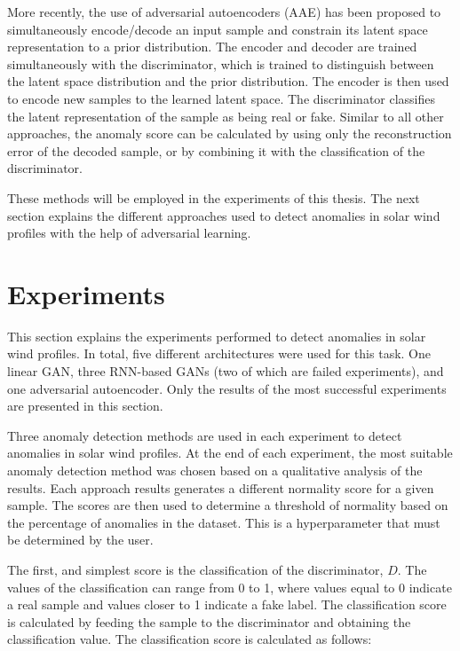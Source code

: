 More recently, the use of adversarial autoencoders (AAE) has been proposed \cite{zenati.etal_AdversariallyLearnedAnomaly_2018,wang.etal_AdVAESelfadversarialVariational_2020} to simultaneously encode/decode an input sample and constrain its latent space representation to a prior distribution. The encoder and decoder are trained simultaneously with the discriminator, which is trained to distinguish between the latent space distribution and the prior distribution. The encoder is then used to encode new samples to the learned latent space. The discriminator classifies the latent representation of the sample as being real or fake. Similar to all other approaches, the anomaly score can be calculated by using only the reconstruction error of the decoded sample, or by combining it with the classification of the discriminator.

These methods will be employed in the experiments of this thesis. The next section explains the different approaches used to detect anomalies in solar wind profiles with the help of adversarial learning.

\section{Experiments}\label{sec:gan_experiments}
This section explains the experiments performed to detect anomalies in solar wind profiles. In total, five different architectures were used for this task. One linear GAN, three RNN-based GANs (two of which are failed experiments), and one adversarial autoencoder. Only the results of the most successful experiments are presented in this section.

Three anomaly detection methods are used in each experiment to detect anomalies in solar wind profiles. At the end of each experiment, the most suitable anomaly detection method was chosen based on a qualitative analysis of the results. Each approach results generates a different normality score for a given sample. The scores are then used to determine a threshold of normality based on the percentage of anomalies in the dataset. This is a hyperparameter that must be determined by the user.

The first, and simplest score is the classification of the discriminator, $D$. The values of the classification can range from 0 to 1, where values equal to 0 indicate a real sample and values closer to 1 indicate a fake label. The classification score is calculated by feeding the sample to the discriminator and obtaining the classification value. The classification score is calculated as follows:

